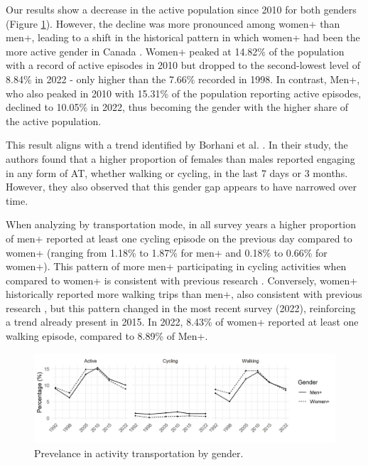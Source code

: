 \documentclass[preprint, 3p,
authoryear]{elsarticle} %
\begin{document}
Our results show a decrease in the active population since 2010 for both
genders (Figure \ref{fig:gender-perc-figure}). However, the decline was
more pronounced among women+ than men+, leading to a shift in the
historical pattern in which women+ had been the more active gender in
Canada \citep{bryan2009, borhani2024}. Women+ peaked at 14.82\% of the
population with a record of active episodes in 2010 but dropped to the
second-lowest level of 8.84\% in 2022 - only higher than the 7.66\%
recorded in 1998. In contrast, Men+, who also peaked in 2010 with
15.31\% of the population reporting active episodes, declined to 10.05\%
in 2022, thus becoming the gender with the higher share of the active
population.

This result aligns with a trend identified by Borhani et al.
\citeyearpar{borhani2024}. In their study, the authors found that a
higher proportion of females than males reported engaging in any form of
AT, whether walking or cycling, in the last 7 days or 3 months. However,
they also observed that this gender gap appears to have narrowed over
time.

When analyzing by transportation mode, in all survey years a higher
proportion of men+ reported at least one cycling episode on the previous
day compared to women+ (ranging from 1.18\% to 1.87\% for men+ and
0.18\% to 0.66\% for women+). This pattern of more men+ participating in
cycling activities when compared to women+ is consistent with previous
research \citep{heesch2012, bryan2009, borhani2024}. Conversely, women+
historically reported more walking trips than men+, also consistent with
previous research \citep{goel2023, pollard2017, bryan2009, borhani2024},
but this pattern changed in the most recent survey (2022), reinforcing a
trend already present in 2015. In 2022, 8.43\% of women+ reported at
least one walking episode, compared to 8.89\% of Men+.

\begin{figure}
\includegraphics[width=1\linewidth]{figures/active_pop_gender_graph} \caption{Prevelance in activity transportation by gender.}\label{fig:gender-perc-figure}
\end{figure}
\end{document}
